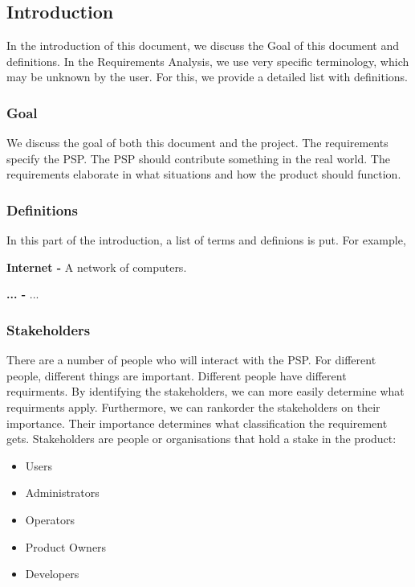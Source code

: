 \documentclass[10pt]{report}
\begin{document}
\subsection{Introduction}

In the introduction of this document, we discuss the Goal of this document and definitions. In the Requirements Analysis, we use very specific terminology, which may be unknown by the user. For this, we provide a detailed list with definitions.

\subsubsection{Goal}

We discuss the goal of both this document and the project. The requirements specify the PSP. The PSP should contribute something in the real world. The requirements elaborate in what situations and how the product should function.

\subsubsection{Definitions}

In this part of the introduction, a list of terms and definions is put. For example,

\textbf{Internet - } A network of computers.

\textbf{... - } ...

\subsubsection{Stakeholders}

There are a number of people who will interact with the PSP. For different people, different things are important. Different people have different requirments. By identifying the stakeholders, we can more easily determine what requirments apply. Furthermore, we can rankorder the stakeholders on their importance. Their importance determines what classification the requirement gets. Stakeholders are people or organisations that hold a stake in the product:

\begin{itemize}
	\item Users
	\item Administrators
	\item Operators
	\item Product Owners
	\item Developers
\end{itemize}
\end{document}
